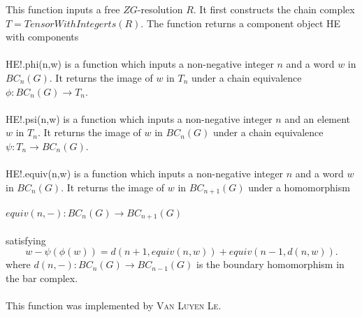 \documentclass[a4paper,11pt]{report}
\begin{document}
{ This function inputs a free $ZG$-resolution $R$. It first constructs the chain complex $T=TensorWithIntegerts(R)$. The function returns a component object HE with components \\
 \\
 HE!.phi(n,w) is a function which inputs a non-negative integer $n$ and a word $w$ in $BC_n(G)$. It returns the image of $w$ in $T_n$ under a chain equivalence $\phi\colon BC_n(G) \rightarrow T_n$.\\
 \\
 HE!.psi(n,w) is a function which inputs a non-negative integer $n$ and an element $w$ in $T_n$. It returns the image of $w$ in $BC_n(G)$ under a chain equivalence $\psi\colon T_n \rightarrow BC_n(G)$.\\
 \\
 HE!.equiv(n,w) is a function which inputs a non-negative integer $n$ and a word $w$ in $BC_n(G)$. It returns the image of $w$ in $BC_{n+1}(G)$ under a homomorphism \\
 \\
 $equiv(n,-) \colon BC_n(G) \rightarrow BC_{n+1}(G)$ \\
 \\
 satisfying 
\[w - \psi ( \phi (w)) = d(n+1, equiv(n,w)) + equiv(n-1,d(n,w)) . \]
 where $d(n,-)\colon BC_n(G) \rightarrow BC_{n-1}(G)$ is the boundary homomorphism in the bar complex. \\
 \\
 This function was implemented by \textsc{Van Luyen Le}. \\
 \\
 \\
 }

 
\end{document}

